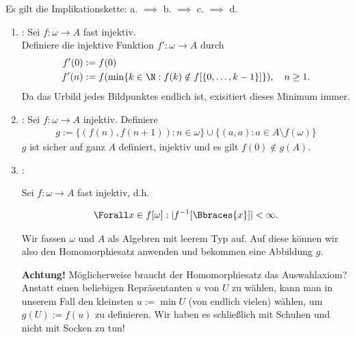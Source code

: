 \begin{solution}

Es gilt die Implikationskette: a. $\implies$ b. $\implies$ c. $\implies$ d.

\begin{enumerate}[label = \texttt{ad}]

  \item {}: Sei $f: \omega \to A$ fast injektiv. \\
  Definiere die injektive Funktion $f': \omega \to A$ durch
  \begin{align*}
    f'(0) &:= f(0) \\
    f'(n) &:= f(\min\{k \in  \N:  f(k) \notin f[\{0,\dots,k-1\}]\}), \quad n \geq 1.
  \end{align*}
  Da das Urbild jedes Bildpunktes endlich ist, exisitiert dieses Minimum immer.

  \item {}: Sei $f: \omega \to A$ injektiv.
  Definiere
  \begin{align*}
    g := \{(f(n),f(n+1)): n \in \omega\} \cup \{(a,a): a \in A \setminus f(\omega)\}
  \end{align*}
  $g$ ist sicher auf ganz $A$ definiert, injektiv und es gilt $f(0) \notin g(A)$.

  \item {}:

    Sei $f: \omega \to A$ fast injektiv, d.h.

    \begin{align*}
      \Forall x \in f[\omega]:
      |f^{-1}[\Bbraces{x}]| < \infty.
    \end{align*}

    Wir fassen $\omega$ und $A$ als Algebren mit leerem Typ auf.
    Auf diese können wir also den Homomorphiesatz anwenden und bekommen eine Abbildung $g$.

    \textbf{Achtung!}
    Möglicherweise braucht der Homomorphiesatz das Auswahlaxiom?
    Anstatt einen beliebigen Repräsentanten $u$ von $U$ zu wählen, kann man in unserem Fall den kleinsten $u := \min U$ (von endlich vielen) wählen, um $g(U) := f(u)$ zu definieren.
    Wir haben es schließlich mit Schuhen und nicht mit Socken zu tun!

    \phantom{}



\end{enumerate}
\end{solution}
